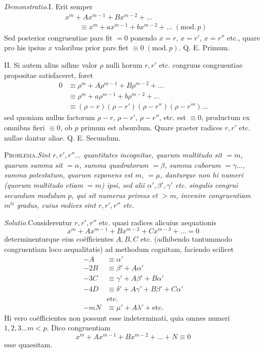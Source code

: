\emph{Demonstratio.}\quad I. Erit semper
\[
\begin{aligned}
&x^m+Ax^{m-1}+Bx^{m-2}+\ldots\\
&\qquad\equiv x^m+ax^{m-1}+bx^{m-2}+\ldots\;(\mathrm{mod.}\,p)
\end{aligned}
\]
Sed posterior congruentiae pars fit $=0$ ponendo $x=r$, $x=r'$, $x=r''$ etc., quare pro his ipsius $x$ valoribus prior pars fiet $\equiv0\;(\mathrm{mod.}\,p)$. Q. E. Primum.

II. Si autem alius adhuc valor $\rho$ nulli horum $r,r'$ etc. congruus congruentiae propositae satisfaceret, foret
\[
\begin{aligned}
0&\equiv\rho^m+A\rho^{m-1}+B\rho^{m-2}+\ldots\\
&\equiv\rho^m+a\rho^{m-1}+b\rho^{m-2}+\ldots\\
&\equiv(\rho-r)(\rho-r')(\rho-r'')(\rho-r''')\ldots
\end{aligned}
\]
sed quoniam nullus factorum $\rho-r$, $\rho-r'$, $\rho-r''$, etc. est $\equiv0$, productum ex omnibus fieri $\equiv0$, ob $p$ primum est absurdum. Quare praeter radices $r,r'$ etc. nullae dantur aliae. Q. E. Secundum.

\textsc{Problema.}\quad\emph{Sint $r,r',r''\ldots$ quantitates incognitae, quarum multitudo sit $=m$, quarum summa sit $=\alpha$, summa quadratorum $=\beta$, summa cuborum $=\gamma\ldots$, summa potestatum, quarum exponens est $m$, $=\mu$, danturque non hi numeri (quorum multitudo etiam $=m$) ipsi, sed alii $\alpha',\beta',\gamma'$ etc. singulis congrui secundum modulum $p$, qui sit numerus primus et $>m$, invenire congruentiam $m^{\mathrm{ti}}$ gradus, cuius radices sint $r,r',r''$ etc.}

\emph{Solutio.}\quad Considerentur $r,r',r''$ etc. quasi radices alicuius aequationis
\[
x^m+Ax^{m-1}+Bx^{m-2}+Cx^{m-3}+\ldots=0
\]
determinenturque eius coëfficientes $A,B,C$ etc. (adhibendo tantummodo congruentiam loco aequalitatis) ad methodum cognitam, faciendo scilicet
\[
\begin{aligned}
-A&\equiv\alpha'\\
-2B&\equiv\beta'+A\alpha'\\
-3C&\equiv\gamma'+A\beta'+B\alpha'\\
-4D&\equiv\delta'+A\gamma'+B\beta'+C\alpha'\\
&\text{etc.}\\
-mN&\equiv\mu'+A\lambda'+\text{etc.}
\end{aligned}
\]
Hi vero coëfficientes non possunt esse indeterminati, quia omnes numeri $1,2,3\ldots m<p$. Dico congruentiam
\[
x^m+Ax^{m-1}+Bx^{m-2}+\ldots+N\equiv0
\]
esse quaesitam.

